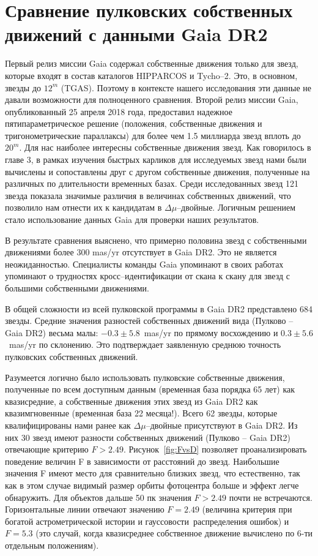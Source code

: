 \chapter{Сравнение пулковских собственных движений с данными Gaia DR2} \label{ch:ch6}
Первый релиз миссии Gaia содержал собственные движения только для звезд, которые входят в состав каталогов HIPPARCOS и Tycho--2. Это, в основном, звезды до $12^m$ (TGAS). Поэтому в контексте нашего исследования эти данные не давали возможности для полноценного сравнения. Второй релиз миссии Gaia, опубликованный 25 апреля 2018 года, предоставил надежное пятипараметрическое решение (положения, собственные движения и тригонометрические параллаксы) для более чем 1.5 миллиарда звезд  вплоть до $20^m$. Для нас наиболее интересны собственные движения звезд. Как говорилось в главе 3, в рамках изучения быстрых карликов для исследуемых звезд нами  были вычислены и сопоставлены друг с другом собственные движения, полученные на различных по длительности временных базах. Среди исследованных звезд 121 звезда показала значимые различия в величинах собственных движений, что позволило нам отнести их к кандидатам в $\Delta\mu$--двойные. Логичным решением стало использование данных Gaia для проверки наших результатов.

В результате сравнения выяснено, что примерно половина звезд с собственными движениями более 300 mas/yr отсутствует в Gaia DR2. Это не является неожиданностью. Специалисты команды Gaia упоминают в своих работах \cite{2018A&A...616A...2L} упоминают о трудностях кросс--идентификации от скана к скану для звезд с большими собственными движениями.

В общей сложности из всей пулковской программы в Gaia DR2 представлено 684 звезды. Средние значения разностей собственных движений вида (Пулково -- Gaia DR2) весьма малы: $-0.3\pm5.8$~mas/yr по прямому восхождению и $0.3\pm5.6$~mas/yr по склонению. Это подтверждает заявленную среднюю точность пулковских собственных движений.

Разумеется логично было использовать пулковские собственные движения, полученные по всем доступным данным (временная база порядка 65 лет) как квазисредние, а собственные движения этих звезд из Gaia DR2 как квазимгновенные (временная база 22 месяца!). Всего 62 звезды, которые квалифицированы нами ранее как $\Delta\mu$--двойные присутствуют в Gaia DR2. Из них 30 звезд имеют разности собственных движений  (Пулково -- Gaia DR2) отвечающие критерию $F>2.49$. Рисунок~\ref{fig:FvsD} позволяет проанализировать поведение величин F в зависимости от расстояний до звезд. Наибольшие значения F имеют место для сравнительно близких звезд, что естественно, так как в этом случае видимый размер орбиты фотоцентра больше и эффект легче обнаружить. Для объектов дальше 50 пк значения $F>2.49$ почти не встречаются. Горизонтальные линии отвечают значению $F=2.49$ (величина критерия при богатой астрометрической истории и \glqq гауссовости\grqq\ распределения ошибок) и $F=5.3$ (это случай, когда квазисреднее собственное движение вычислено по 6-ти отдельным положениям).

